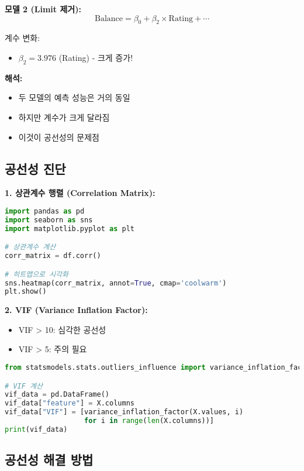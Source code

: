 \documentclass[12pt]{article}
\begin{document}
\textbf{모델 2 (Limit 제거):}
\begin{equation}
\text{Balance} = \beta_0 + \beta_2 \times \text{Rating} + \cdots
\end{equation}

계수 변화:
\begin{itemize}
    \item $\beta_2 = 3.976$ (Rating) - 크게 증가!
\end{itemize}

\textbf{해석:}
\begin{itemize}
    \item 두 모델의 예측 성능은 거의 동일
    \item 하지만 계수가 크게 달라짐
    \item 이것이 공선성의 문제점
\end{itemize}

\subsection{공선성 진단}

\textbf{1. 상관계수 행렬 (Correlation Matrix):}
\begin{lstlisting}[language=Python]
import pandas as pd
import seaborn as sns
import matplotlib.pyplot as plt

# 상관계수 계산
corr_matrix = df.corr()

# 히트맵으로 시각화
sns.heatmap(corr_matrix, annot=True, cmap='coolwarm')
plt.show()
\end{lstlisting}

\textbf{2. VIF (Variance Inflation Factor):}
\begin{itemize}
    \item VIF > 10: 심각한 공선성
    \item VIF > 5: 주의 필요
\end{itemize}

\begin{lstlisting}[language=Python]
from statsmodels.stats.outliers_influence import variance_inflation_factor

# VIF 계산
vif_data = pd.DataFrame()
vif_data["feature"] = X.columns
vif_data["VIF"] = [variance_inflation_factor(X.values, i)
                   for i in range(len(X.columns))]
print(vif_data)
\end{lstlisting}

\subsection{공선성 해결 방법}
\end{document}
